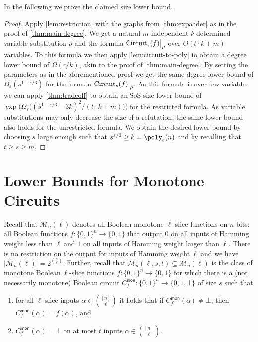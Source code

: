 \documentclass[10pt,a4paper]{article}
\theoremstyle{plain}
\theoremstyle{remark}
\theoremstyle{definition}
\newcommand{\eps}{\varepsilon}
\newcommand{\set}[1]{\{#1\}}
\newcommand\restrict[2]{{%
  \left.\kern-\nulldelimiterspace %
  #1 %
  \vphantom{\big|} %
  \right|_{#2} %
  }}
\newcommand{\calM}{\mathcal{M}}
\newcommand{\mon}{{\mathsf{mon}}}
\DeclareMathOperator{\circuit}{Circuit}
\begin{document}
In the following we prove the claimed size lower bound.

\MainSize*

\begin{proof}
  Apply \cref{lem:restriction} with the graphs from
  \cref{thm:expander} as in the proof of \cref{thm:main-degree}. We
  get a natural $m$-independent $k$-determined variable substitution
  $\rho$ and the formula $\restrict{\circuit_s(f)}{\rho}$ over
  $O(t \cdot k + m)$ variables.  To this formula we then apply
  \cref{lem:circuit-to-poly} to obtain a degree lower bound of
  $\Omega(r/k)$, akin to the proof of \cref{thm:main-degree}. By
  setting the parameters as in the aforementioned proof we get the
  same degree lower bound of $\Omega_\eps(s^{1-\eps/3})$ for the
  formula $\restrict{\circuit_s(f)}{\rho}$. As this formula is over
  few variables we can apply \cref{thm:tradeoff} to obtain an SoS size
  lower bound of
  $\exp \Big( \Omega_\eps\big((s^{1- \eps/3} - 3k)^2/(t \cdot k +
  m)\big) \Big)$ for the restricted formula. As variable substitutions
  may only decrease the size of a refutation, the same lower bound
  also holds for the unrestricted formula. We obtain the desired lower
  bound by choosing $s$ large enough such that
  $s^{\eps/3} \ge k = \poly_\eps(n)$ and by recalling that
  $t \ge s \ge m$. 
\end{proof}

\section{Lower Bounds for Monotone Circuits}
\label{sec:monotone-degree-LB}

Recall that $\calM_n(\ell)$ denotes all Boolean monotone $\ell$-slice
functions on $n$ bits: all Boolean functions
$f: \{0,1\}^n \rightarrow \{0,1\}$ that output $0$ on all inputs of
Hamming weight less than $\ell$ and $1$ on all inputs of Hamming
weight larger than $\ell$. There is no restriction on the output for
inputs of Hamming weight $\ell$ and we have
$|\calM_n(\ell)| = 2^{\binom{n}{\ell}}$.
%
Further, recall that $\calM_n(\ell, s, t) \subseteq \calM_n(\ell)$ is
the class of monotone Boolean $\ell$-slice functions
$f: \set{0,1}^n \rightarrow \set{0,1}$ for which there is a
(not necessarily monotone) Boolean circuit
$C_f^\mon: \set{0,1}^n \rightarrow \set{0,1, \bot}$ of size $s$ such
that
\begin{enumerate}
\item for all $\ell$-slice inputs $\alpha \in \binom{[n]}{\ell}$ it
  holds that if $C^\mon_f(\alpha) \neq \bot$, then
  $C^\mon_f(\alpha) = f(\alpha)$, and
\item $C^\mon_f(\alpha) = \bot$ on at most $t$ inputs
  $\alpha \in \binom{[n]}{\ell}$.
\end{enumerate}
\end{document}
